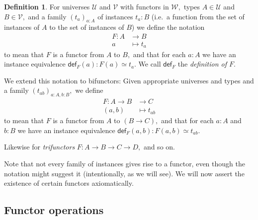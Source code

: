 \documentclass[a4paper]{article}
\theoremstyle{definition}
\newtheorem{definition}{Definition}[section]
\theoremstyle{remark}
\newcommand{\defn}{\emph}
\renewcommand{\equiv}{\simeq}
\newcommand{\U}{\mathcal{U}}
\newcommand{\V}{\mathcal{V}}
\newcommand{\W}{\mathcal{W}}
\newcommand{\nm}{\mathsf}
\newcommand{\fndef}[1]{\nm{def}_{#1}}
\begin{document}
\begin{definition}
  For universes $\U$ and $\V$ with functors in $\W,$ types $A \in \U$ and $B \in \V,$
  and a family $(t_a)_{a : A}$ of instances $t_a : B$ (i.e.\ a function from the set of
  instances of $A$ to the set of instances of $B$) we define the notation
  \begin{align*}
    F : A &\to     B\\
        a &\mapsto t_a
  \end{align*}
  to mean that $F$ is a functor from $A$ to $B,$ and that for each $a : A$ we have an instance
  equivalence $\fndef{F}(a) : F(a) \equiv t_a.$ We call $\fndef{F}$ the
  \defn{definition of $F$}.

  We extend this notation to bifunctors: Given appropriate universes and types and a
  family $(t_{ab})_{a : A, b : B},$ we define
  \begin{align*}
    F : A \to B &\to     C\\
        (a,b)   &\mapsto t_{ab}
  \end{align*}
  to mean that $F$ is a functor from $A$ to $(B \to C),$ and that for each $a : A$ and $b : B$ we
  have an instance equivalence $\fndef{F}(a,b) : F(a,b) \equiv t_{ab}.$

  Likewise for \defn{trifunctors} $F : A \to B \to C \to D,$ and so on.
\end{definition}

Note that not every family of instances gives rise to a functor, even though the notation might
suggest it (intentionally, as we will see). We will now assert the existence of certain functors
axiomatically.

\subsection{Functor operations}
\label{sec:funop}
\end{document}
